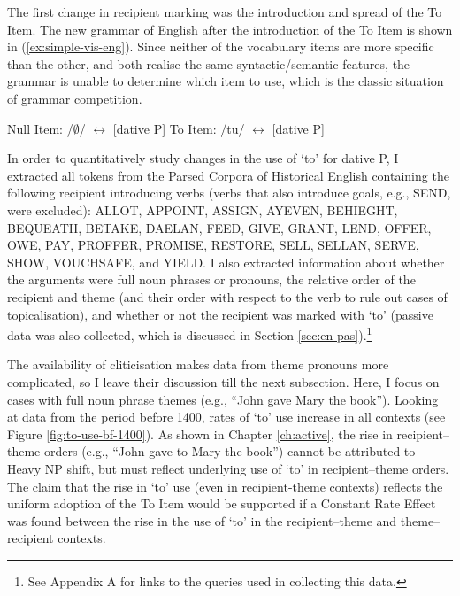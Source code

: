 	The first change in recipient marking was the introduction and spread of the To Item. The new grammar of English after the introduction of the To Item is shown in (\ref{ex:simple-vis-eng}). Since neither of the vocabulary items are more specific than the other, and both realise the same syntactic/semantic features, the grammar is unable to determine which item to use, which is the classic situation of grammar competition.

	\begin{exe}
		\ex \label{ex:simple-vis-eng}
		\begin{xlist}
			\ex Null Item: /$\emptyset$/ $\leftrightarrow$ [dative P]
			\ex To Item: /tu/ $\leftrightarrow$ [dative P]
		\end{xlist}
	\end{exe}


	In order to quantitatively study changes in the use of `to' for dative P, I extracted all tokens from the Parsed Corpora of Historical English \citep{Kroch.2000,Taylor.2003,Kroch.2004,Taylor.2006,Kroch.2010} containing the following recipient introducing verbs (verbs that also introduce goals, e.g., SEND, were excluded): ALLOT, APPOINT, ASSIGN, AYEVEN, BEHIEGHT, BEQUEATH, BETAKE, DAELAN, FEED, GIVE, GRANT, LEND, OFFER, OWE, PAY, PROFFER, PROMISE, RESTORE, SELL, SELLAN, SERVE, SHOW, VOUCHSAFE, and YIELD. I also extracted information about whether the arguments were full noun phrases or pronouns, the relative order of the recipient and theme (and their order with respect to the verb to rule out cases of topicalisation), and whether or not the recipient was marked with `to' (passive data was also collected, which is discussed in Section \ref{sec:en-pas}).\footnote{See Appendix A for links to the queries used in collecting this data.}

	The availability of cliticisation makes data from theme pronouns more complicated, so I leave their discussion till the next subsection. Here, I focus on cases with full noun phrase themes (e.g., ``John gave Mary the book''). Looking at data from the period before 1400, rates of `to' use increase in all contexts (see Figure \ref{fig:to-use-bf-1400}). As shown in Chapter \ref{ch:active}, the rise in recipient--theme orders (e.g., ``John gave to Mary the book'') cannot be attributed to Heavy NP shift, but must reflect underlying use of `to' in recipient--theme orders. The claim that the rise in `to' use (even in recipient-theme contexts) reflects the uniform adoption of the To Item would be supported if a Constant Rate Effect was found between the rise in the use of `to' in the recipient--theme and theme--recipient contexts.

